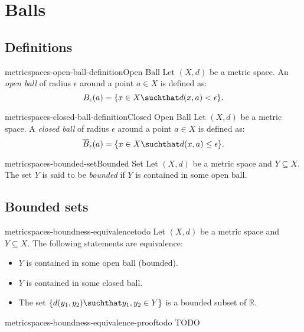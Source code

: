 \documentclass[preview]{standalone}
\begin{document}

\section{Balls}

\subsection{Definitions}

\begin{snippetdefinition}{metricspaces-open-ball-definition}{Open Ball}
    Let \((X, d)\) be a metric space.
    An \textit{open ball} of radius \(\epsilon\) around a point
    \(a \in X\) is defined as:
    \[
        B_\epsilon(a) = \{x \in X \suchthat d(x,a) < \epsilon\}.
    \]
\end{snippetdefinition}

\begin{snippetdefinition}{metricspaces-closed-ball-definition}{Closed Open Ball}
    Let \((X, d)\) be a metric space.
    A \textit{closed ball} of radius \(\epsilon\) around a point
    \(a \in X\) is defined as:
    \[
        \overline{B}_\epsilon(a) = \{x \in X \suchthat d(x,a) \leq \epsilon\}.
    \]
\end{snippetdefinition}

\begin{snippetdefinition}{metricspaces-bounded-set}{Bounded Set}
    Let \((X, d)\) be a metric space and \(Y \subseteq X\).
    The set \(Y\) is said to be \textit{bounded} if \(Y\)
    is contained in some open ball.
\end{snippetdefinition}

\subsection{Bounded sets}

\begin{snippetlemma}{metricspaces-boundness-equivalence}{todo}
    Let \((X, d)\) be a metric space and \(Y \subseteq X\).
    The following statements are equivalence:
    \begin{itemize}
        \item \(Y\) is contained in some open ball (bounded).
        \item \(Y\) is contained in some closed ball.
        \item The set \(\{d(y_1,y_2) \suchthat y_1, y_2 \in Y\}\)
            is a bounded subset of \(\mathbb{R}\).
    \end{itemize}
\end{snippetlemma}

\begin{snippetproof}{metricspaces-boundness-equivalence-proof}{todo}
    TODO
\end{snippetproof}
\end{document}
